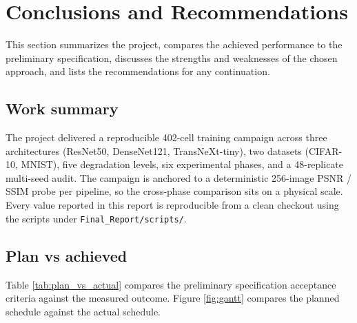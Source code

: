 \section{Conclusions and Recommendations}
\label{sec:conclusions}

This section summarizes the project, compares the achieved performance to
the preliminary specification, discusses the strengths and weaknesses of
the chosen approach, and lists the recommendations for any continuation.

\subsection{Work summary}
The project delivered a reproducible 402-cell training campaign across
three architectures (ResNet50, DenseNet121, TransNeXt-tiny), two datasets
(CIFAR-10, MNIST), five degradation levels, six experimental phases, and
a 48-replicate multi-seed audit. The campaign is anchored to a
deterministic 256-image PSNR / SSIM probe per pipeline, so the cross-phase
comparison sits on a physical scale. Every value reported in this report
is reproducible from a clean checkout using the scripts under
\texttt{Final\_Report/scripts/}.

\subsection{Plan vs achieved}
Table \ref{tab:plan_vs_actual} compares the preliminary specification
acceptance criteria against the measured outcome. Figure
\ref{fig:gantt} compares the planned schedule against the actual schedule.

